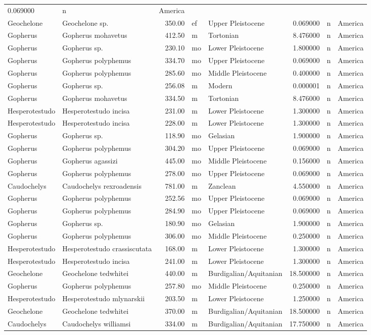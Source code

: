 \documentclass[]{article}
\begin{document}
\begin{longtable}[]{@{}llrllrll@{}}
0.069000 & n & America\tabularnewline
Geochelone & Geochelone sp. & 350.00 & ef & Upper Pleistocene & 0.069000
& n & America\tabularnewline
Gopherus & Gopherus mohavetus & 412.50 & m & Tortonian & 8.476000 & n &
America\tabularnewline
Gopherus & Gopherus sp. & 230.10 & mo & Lower Pleistocene & 1.800000 & n
& America\tabularnewline
Gopherus & Gopherus polyphemus & 334.70 & mo & Upper Pleistocene &
0.069000 & n & America\tabularnewline
Gopherus & Gopherus polyphemus & 285.60 & mo & Middle Pleistocene &
0.400000 & n & America\tabularnewline
Gopherus & Gopherus sp. & 256.08 & m & Modern & 0.000001 & n &
America\tabularnewline
Gopherus & Gopherus mohavetus & 334.50 & m & Tortonian & 8.476000 & n &
America\tabularnewline
Hesperotestudo & Hesperotestudo incisa & 231.00 & m & Lower Pleistocene
& 1.300000 & n & America\tabularnewline
Hesperotestudo & Hesperotestudo incisa & 228.00 & m & Lower Pleistocene
& 1.300000 & n & America\tabularnewline
Gopherus & Gopherus sp. & 118.90 & mo & Gelasian & 1.900000 & n &
America\tabularnewline
Gopherus & Gopherus polyphemus & 304.20 & mo & Upper Pleistocene &
0.069000 & n & America\tabularnewline
Gopherus & Gopherus agassizi & 445.00 & mo & Middle Pleistocene &
0.156000 & n & America\tabularnewline
Gopherus & Gopherus polyphemus & 278.00 & mo & Upper Pleistocene &
0.069000 & n & America\tabularnewline
Caudochelys & Caudochelys rexroadensis & 781.00 & m & Zanclean &
4.550000 & n & America\tabularnewline
Gopherus & Gopherus polyphemus & 252.56 & mo & Upper Pleistocene &
0.069000 & n & America\tabularnewline
Gopherus & Gopherus polyphemus & 284.90 & mo & Upper Pleistocene &
0.069000 & n & America\tabularnewline
Gopherus & Gopherus sp. & 180.90 & mo & Gelasian & 1.900000 & n &
America\tabularnewline
Gopherus & Gopherus polyphemus & 306.00 & mo & Middle Pleistocene &
0.250000 & n & America\tabularnewline
Hesperotestudo & Hesperotestudo crassiscutata & 168.00 & m & Lower
Pleistocene & 1.300000 & n & America\tabularnewline
Hesperotestudo & Hesperotestudo incisa & 241.00 & m & Lower Pleistocene
& 1.300000 & n & America\tabularnewline
Geochelone & Geochelone tedwhitei & 440.00 & m & Burdigalian/Aquitanian
& 18.500000 & n & America\tabularnewline
Gopherus & Gopherus polyphemus & 257.80 & mo & Middle Pleistocene &
0.250000 & n & America\tabularnewline
Hesperotestudo & Hesperotestudo mlynarskii & 203.50 & m & Lower
Pleistocene & 1.250000 & n & America\tabularnewline
Geochelone & Geochelone tedwhitei & 370.00 & m & Burdigalian/Aquitanian
& 18.500000 & n & America\tabularnewline
Caudochelys & Caudochelys williamsi & 334.00 & m &
Burdigalian/Aquitanian & 17.750000 & n & America\tabularnewline

\end{longtable}
\end{document}
